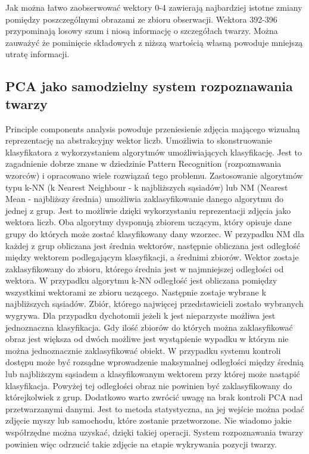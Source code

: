 \documentclass[oneside, eng]{mgr}
\begin{document}
Jak można łatwo zaobserwować wektory 0-4 zawierają najbardziej istotne zmiany pomiędzy poszczególnymi obrazami ze zbioru obserwacji. Wektora 392-396 przypominają losowy szum i niosą informację o szczegółach twarzy. Można zauważyć że pominięcie składowych z niższą wartością własną powoduje mniejszą utratę informacji.

\subsection{PCA jako samodzielny system rozpoznawania twarzy}
Principle components analysis powoduje przeniesienie zdjęcia mającego wizualną reprezentację na abstrakcyjny wektor liczb. Umożliwia to skonstruowanie klasyfikatora z wykorzystaniem algorytmów umożliwiających klasyfikację. Jest to zagadnienie dobrze znane w dziedzinie Pattern Recognition (rozpoznawania wzorców) i opracowano wiele rozwiązań tego problemu. Zastosowanie algorytmów typu k-NN (k Nearest Neighbour - k najbliższych sąsiadów) lub NM (Nearest Mean - najbliższy średnia) umożliwia zaklasyfikowanie danego algorytmu do jednej z grup. Jest to możliwie dzięki wykorzystaniu reprezentacji zdjęcia jako wektora liczb. Oba algorytmy dysponują zbiorem uczącym, który opisuje dane grupy do których może zostać klasyfikowany dany wzorzec. 
W przypadku NM dla każdej z grup obliczana jest średnia wektorów, następnie obliczana jest odległość między wektorem podlegającym klasyfikacji, a średnimi zbiorów. Wektor zostaje zaklasyfikowany do zbioru, którego średnia jest w najmniejszej odległości od wektora. 
W przypadku algorytmu k-NN odległość jest obliczana pomiędzy wszystkimi wektorami ze zbioru uczącego. Następnie zostaje wybrane k najbliższych sąsiadów. Zbiór, którego najwięcej przedstawicieli zostało wybranych wygrywa. Dla przypadku dychotomii jeżeli k jest nieparzyste możliwa jest jednoznaczna klasyfikacja. Gdy ilość zbiorów do których można zaklasyfikować obraz jest większa od dwóch możliwe jest wystąpienie wypadku w którym nie można jednoznacznie zaklasyfikować obiekt. 
W przypadku systemu kontroli dostępu może być rozsądne wprowadzenie maksymalnej odległości między średnią lub najbliższym sąsiadem a klasyfikowanym wektorem przy której może nastąpić klasyfikacja. Powyżej tej odległości obraz nie powinien być zaklasyfikowany do którejkolwiek z grup. 
Dodatkowo warto zwrócić uwagę na brak kontroli PCA nad przetwarzanymi danymi. Jest to metoda statystyczna, na jej wejście można podać zdjęcie myszy lub samochodu, które zostanie przetworzone. Nie wiadomo jakie współrzędne można uzyskać, dzięki takiej operacji. System rozpoznawania twarzy powinien więc odrzucić takie zdjęcie na etapie wykrywania pozycji twarzy.
\end{document}
